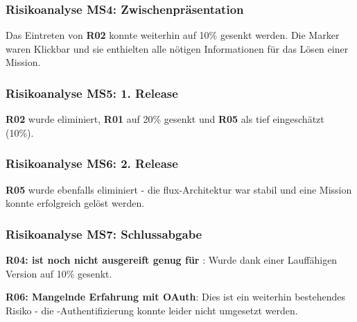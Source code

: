 \subsubsection{Risikoanalyse MS4: Zwischenpräsentation}
Das Eintreten von \textbf{R02} konnte weiterhin auf 10\% gesenkt werden. Die Marker waren Klickbar und sie enthielten alle nötigen Informationen für das Lösen einer Mission.

\subsubsection{Risikoanalyse MS5: 1. Release}
\textbf{R02} wurde eliminiert, \textbf{R01} auf 20\% gesenkt und \textbf{R05} als tief eingeschätzt (10\%).

\subsubsection{Risikoanalyse MS6: 2. Release}
\textbf{R05} wurde ebenfalls eliminiert - die flux-Architektur war stabil und eine Mission konnte erfolgreich gelöst werden.

\subsubsection{Risikoanalyse MS7: Schlussabgabe}
\textbf{R04:  ist noch nicht ausgereift genug für }: Wurde dank einer Lauffähigen Version auf 10\% gesenkt.

\textbf{R06: Mangelnde Erfahrung mit \gls{OAuth}}: Dies ist ein weiterhin bestehendes Risiko - die -Authentifizierung konnte leider nicht umgesetzt werden.